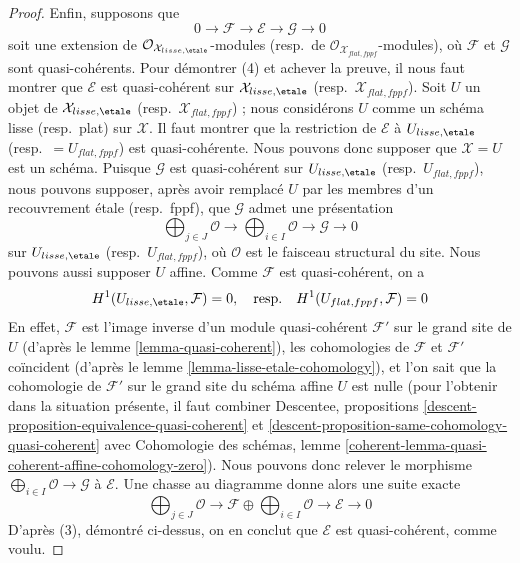 \begin{proof}
\medskip\noindent
Enfin, supposons que
$$
0 \to \mathcal{F} \to \mathcal{E} \to \mathcal{G} \to 0
$$
soit une extension de $\mathcal{O}_{\mathcal{X}_{lisse,\etale}}$-modules
(resp.\ de $\mathcal{O}_{\mathcal{X}_{flat,fppf}}$-modules), où $\mathcal{F}$
et $\mathcal{G}$ sont quasi-cohérents. Pour démontrer (4) et achever la preuve,
il nous faut montrer que
$\mathcal{E}$ est quasi-cohérent sur $\mathcal{X}_{lisse,\etale}$
(resp.\ $\mathcal{X}_{flat,fppf}$). Soit $U$
un objet de $\mathcal{X}_{lisse,\etale}$
(resp.\ $\mathcal{X}_{flat,fppf}$) ; nous considérons $U$ comme un schéma lisse
(resp.\ plat) sur $\mathcal{X}$. Il faut montrer que la restriction
de $\mathcal{E}$ à $U_{lisse,\etale}$ (resp.\ $=U_{flat,fppf}$)
est quasi-cohérente. Nous pouvons donc supposer
que $\mathcal{X} = U$ est un schéma. Puisque $\mathcal{G}$
est quasi-cohérent sur $U_{lisse,\etale}$ (resp.\ $U_{flat,fppf}$),
nous pouvons supposer, après avoir remplacé $U$ par les membres
d'un recouvrement étale (resp.\ fppf), que $\mathcal{G}$ admet une
présentation
$$
\bigoplus\nolimits_{j \in J} \mathcal{O} \longrightarrow
\bigoplus\nolimits_{i \in I} \mathcal{O} \longrightarrow
\mathcal{G} \longrightarrow 0
$$
sur $U_{lisse,\etale}$ (resp.\ $U_{flat,fppf}$), où $\mathcal{O}$
est le faisceau structural du site. Nous pouvons aussi supposer $U$ affine.
Comme $\mathcal{F}$ est quasi-cohérent, on a
$$
H^1(U_{lisse,\etale}, \mathcal{F}) = 0,
\quad\text{resp.}\quad
H^1(U_{flat,fppf}, \mathcal{F}) = 0
$$
En effet, $\mathcal{F}$ est l'image inverse d'un module quasi-cohérent
$\mathcal{F}'$ sur le grand site de $U$
(d'après le lemme \ref{lemma-quasi-coherent}), les cohomologies
de $\mathcal{F}$ et $\mathcal{F}'$ coïncident (d'après le
lemme \ref{lemma-lisse-etale-cohomology}), et l'on sait que
la cohomologie de $\mathcal{F}'$ sur le grand site du schéma affine $U$
est nulle (pour l'obtenir dans la situation présente, il faut
combiner Descentee, propositions
\ref{descent-proposition-equivalence-quasi-coherent} et
\ref{descent-proposition-same-cohomology-quasi-coherent} avec
Cohomologie des schémas, lemme
\ref{coherent-lemma-quasi-coherent-affine-cohomology-zero}).
Nous pouvons donc relever le morphisme
$\bigoplus_{i \in I} \mathcal{O} \to \mathcal{G}$
à $\mathcal{E}$. Une chasse au diagramme donne alors
une suite exacte
$$
\bigoplus\nolimits_{j \in J} \mathcal{O} \to
\mathcal{F} \oplus \bigoplus\nolimits_{i \in I} \mathcal{O}
\to
\mathcal{E} \to 0
$$
D'après (3), démontré ci-dessus, on en conclut que $\mathcal{E}$ est
quasi-cohérent, comme voulu.
\end{proof}









